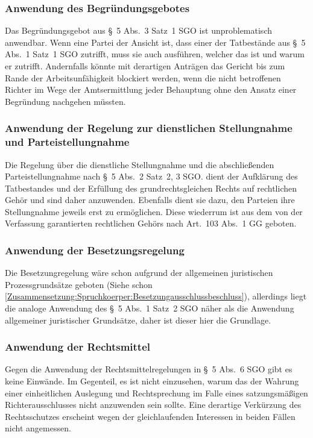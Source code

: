 \subsubsection{Anwendung des Begründungsgebotes}
\label{Zusammensetzung:Spruchkoerper:Befangenheitsvermutung:Begruendungsgebot}
Das Begründungsgebot aus \S~5 Abs.~3 Satz~1 SGO ist unproblematisch anwendbar.
Wenn eine Partei der Ansicht ist, dass einer der Tatbestände aus \S~5 Abs.~1 Satz~1 SGO zutrifft, muss sie auch ausführen, welcher das ist und warum er zutrifft.
Andernfalls könnte mit derartigen Anträgen das Gericht bis zum Rande der Arbeitsunfähigkeit blockiert werden, wenn die nicht betroffenen Richter im Wege der Amtsermittlung jeder Behauptung ohne den Ansatz einer Begründung nachgehen müssten.

\subsubsection{Anwendung der Regelung zur dienstlichen Stellungnahme und Parteistellungnahme}
\label{Zusammensetzung:Spruchkoerper:Befangenheitsvermutung:Stellungnahme}
Die Regelung über die dienstliche Stellungnahme und die abschließenden Parteistellungnahme nach \S~5 Abs.~2 Satz~2, 3 SGO. dient der Aufklärung des Tatbestandes und der Erfüllung des grundrechtsgleichen Rechts auf rechtlichen Gehör und sind daher anzuwenden.
Ebenfalls dient sie dazu, den Parteien ihre Stellungnahme jeweils erst zu ermöglichen.
Diese wiederrum ist aus dem von der Verfassung garantierten rechtlichen Gehörs nach Art.~103 Abs.~1 GG geboten.

\subsubsection{Anwendung der Besetzungsregelung}
\label{Zusammensetzung:Spruchkoerper:Befangenheitsvermutung:Besetzung}
Die Besetzungregelung wäre schon aufgrund der allgemeinen juristischen Prozessgrundsätze geboten (Siehe schon \ref{Zusammensetzung:Spruchkoerper:Besetzungausschlussbeschluss}), allerdings liegt die analoge Anwendung des \S~5 Abs.~1 Satz~2 SGO näher als die Anwendung allgemeiner juristischer Grundsätze, daher ist dieser hier die Grundlage.

\subsubsection{Anwendung der Rechtsmittel}
\label{Zusammensetzung:Spruchkoerper:Befangenheitsvermutung:Rechtsmittel}
Gegen die Anwendung der Rechtsmittelregelungen in \S~5 Abs.~6 SGO gibt es keine Einwände. Im Gegenteil, es ist nicht einzusehen, warum das der Wahrung einer einheitlichen Auslegung und Rechtsprechung im Falle eines satzungsmäßigen Richterausschlusses nicht anzuwenden sein sollte.
Eine derartige Verkürzung des Rechtsschutzes erscheint wegen der gleichlaufenden Interessen in beiden Fällen nicht angemessen.

